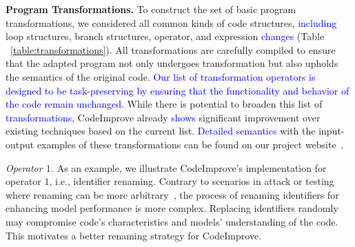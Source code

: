 \textbf{Program Transformations.} To construct the set of basic program transformations, we considered all common kinds of code structures, \textcolor{blue}{including} loop structures, branch structures, operator, and expression \textcolor{blue}{changes} (Table ~\ref{table:transformations}). 
All transformations are carefully compiled to ensure that the adapted program not only undergoes transformation but also upholds the semantics of the original code. \textcolor{blue}{Our list of transformation operators is designed to be task-preserving by ensuring that the functionality and behavior of the code remain unchanged.} %
While there is potential to broaden this list of \textcolor{blue}{transformations}, CodeImprove already \textcolor{blue}{shows} significant improvement over existing techniques based on the current list.
\textcolor{blue}{Detailed semantics} with the input-output examples of these transformations can be found on our project website~\cite{CodeImprove}.


\textit{Operator $1$.} As an example, we illustrate CodeImprove's implementation for operator $1$, i.e., identifier renaming. Contrary to scenarios in attack or testing where renaming can be more arbitrary~\cite{bertattack}, the process of renaming identifiers for enhancing model performance  is more complex. Replacing identifiers randomly may compromise code's characteristics and models' understanding of the code. This motivates a better renaming strategy for CodeImprove. 

